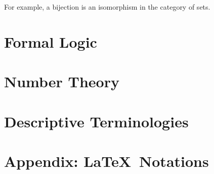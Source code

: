 \documentclass[12pt]{article}
\theoremstyle{definition}
\begin{document}
 	For example, a bijection is an isomorphism in the category of sets.
 	
 	\section{Formal Logic}
 	\section{Number Theory}
 	\section{Descriptive Terminologies}
 	\section{Appendix: \LaTeX\ Notations}
	
\end{document}
